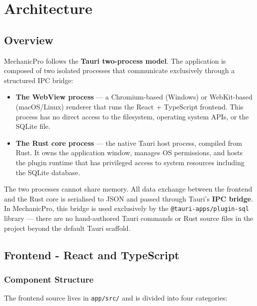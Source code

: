 \documentclass[12pt, a4paper]{report}
\newcommand{\term}[1]{\textbf{\color{Blue}#1}}
\begin{document}
	\chapter{Architecture}

	\section{Overview}
	MechanicPro follows the \term{Tauri two-process model}. The application is
	composed of two isolated processes that communicate exclusively through a
	structured IPC bridge:

	\begin{itemize}
		\item \textbf{The WebView process} --- a Chromium-based (Windows) or
		      WebKit-based (macOS/Linux) renderer that runs the React + TypeScript
		      frontend. This process has no direct access to the filesystem,
		      operating system APIs, or the SQLite file.
		\item \textbf{The Rust core process} --- the native Tauri host process,
		      compiled from Rust. It owns the application window, manages OS
		      permissions, and hosts the plugin runtime that has privileged access
		      to system resources including the SQLite database.
	\end{itemize}

	The two processes cannot share memory. All data exchange between the frontend
	and the Rust core is serialised to JSON and passed through Tauri's
	\term{IPC bridge}. In MechanicPro, this bridge is used exclusively by the
	\texttt{@tauri-apps/plugin-sql} library --- there are no hand-authored Tauri
	commands or Rust source files in the project beyond the default Tauri scaffold.

	\section{Frontend - React and TypeScript}

	\subsection{Component Structure}
	The frontend source lives in \texttt{app/src/} and is divided into four
	categories:
\end{document}
